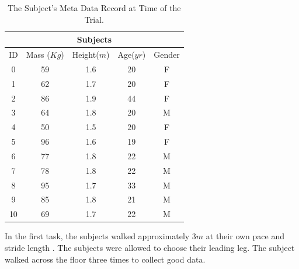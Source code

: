 \begin{table}[h!]
\centering
 \begin{tabular}{|c c c c c|} 
 \hline 
 \multicolumn{5}{|c|}{Subjects} \\
 \hline
 ID & Mass ($Kg$) &  Height($m$)  & Age($yr$)  & Gender \\ [0.5ex] 
 \hline\hline
 0 & 59 & 1.6 & 20 & F \\
 \hline
 1 & 62 & 1.7 & 20 & F \\ 
 \hline
 2 & 86 & 1.9 & 44 & F \\
 \hline
 3 & 64 & 1.8 & 20 & M \\ 
 \hline
 4 & 50 & 1.5 & 20 & F \\
 \hline
 5 & 96 & 1.6 &  19 & F\\
 \hline
 6 & 77 & 1.8 & 22 & M \\
 \hline
 7 & 78 & 1.8 & 22 & M \\
 \hline
 8 & 95 & 1.7 & 33 & M \\
 \hline
 9 & 85 & 1.8 & 21 & M \\
 \hline
 10 & 69 & 1.7 & 22 & M \\[1ex] 
 \hline
\end{tabular}
\caption[Subject Meta Data Table]{The Subject's Meta Data Record at Time of the Trial.}
\label{tab:subjects}
\end{table}



 In the first task, the subjects walked approximately 3$m$ at their own pace and stride length \cite{peters2014concurrent}. The subjects were allowed to choose their leading leg. The subject walked across the floor three times to collect good data. 

